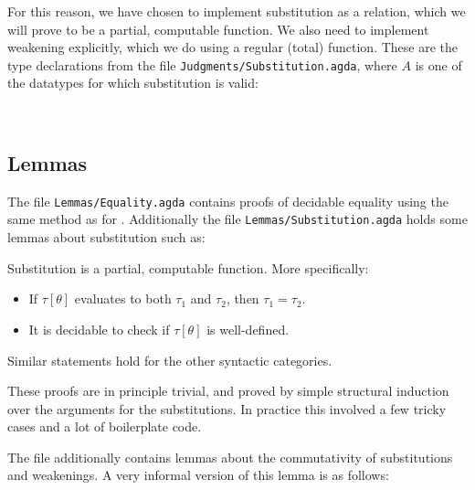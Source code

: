 For this reason, we have chosen to implement substitution as a relation, which
we will prove to be a partial, computable function. We also need to implement
weakening explicitly, which we do using a regular (total) function. These are
the type declarations from the file \texttt{Judgments/Substitution.agda}, where
$A$ is one of the datatypes for which substitution is valid:

\begin{code}
\>[2]\<[4]%
\>[4] \AgdaSymbol{:}       \<%
\\
\>[2]\<[4]%
\>[4] \AgdaSymbol{:}         \<%
\end{code}

\subsection{Lemmas}

The file \texttt{Lemmas/Equality.agda} contains proofs of decidable equality
using the same method as for \ATALe. Additionally the file
\texttt{Lemmas/Substitution.agda} holds some lemmas about substitution such as:

\begin{lemma}
  \label{lemma:computsubst}
  Substitution is a partial, computable function. More specifically:
  \begin{itemize}
  \item If $\tau[\theta]$ evaluates to both $\tau_1$ and $\tau_2$, then
    $\tau_1 = \tau_2$.
  \item It is decidable to check if $\tau[\theta]$ is well-defined.
  \end{itemize}

  Similar statements hold for the other syntactic categories.
\end{lemma}

These proofs are in principle trivial, and proved by simple structural induction
over the arguments for the substitutions. In practice this involved a few tricky
cases and a lot of boilerplate code.

The file additionally contains lemmas about the commutativity of substitutions
and weakenings. A very informal version of this lemma is as follows:

